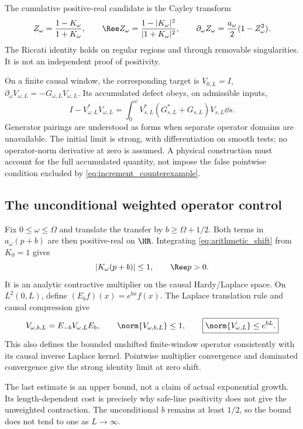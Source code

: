 The cumulative positive-real candidate is the Cayley transform
\begin{equation}
 Z_\omega=\frac{1-K_\omega}{1+K_\omega},\qquad
 \Ree Z_\omega=\frac{1-|K_\omega|^2}{|1+K_\omega|^2},\qquad
 \partial_\omega Z_\omega=\frac{a_\omega}{2}(1-Z_\omega^2).
 \label{eq:cumulative_cayley}
\end{equation}
The Riccati identity holds on regular regions and through removable
singularities. It is not an independent proof of positivity.

On a finite causal window, the corresponding target is
$V_{0,L}=I$, $\partial_\omega V_{\omega,L}=-G_{\omega,L}V_{\omega,L}$.
Its accumulated defect obeys, on admissible inputs,
\begin{equation}
 I-V_{\omega,L}^*V_{\omega,L}
 =\int_0^\omega
 V_{s,L}^*(G_{s,L}^*+G_{s,L})V_{s,L}\dd s.
 \label{eq:accumulated_defect}
\end{equation}
Generator pairings are understood as forms when separate operator domains
are unavailable. The initial limit is strong, with differentiation on
smooth tests; no operator-norm derivative at zero is assumed. A physical
construction must account for the full accumulated quantity, not impose
the false pointwise condition excluded by \eqref{eq:increment_counterexample}.

\subsection{The unconditional weighted operator control}

Fix $0\le\omega\le\Omega$ and translate the transfer by
$b\ge\Omega+1/2$. Both terms in $a_\omega(p+b)$ are then positive-real
on $\HR$. Integrating \eqref{eq:arithmetic_shift} from $K_0=1$ gives
\begin{equation}
 |K_\omega(p+b)|\le1,\qquad \Ree p>0.
\end{equation}
It is an analytic contractive multiplier on the causal Hardy/Laplace
space. On $L^2(0,L)$, define $(E_bf)(x)=e^{bx}f(x)$. The Laplace
translation rule and causal compression give
\begin{equation}
 V_{\omega,b,L}=E_{-b}V_{\omega,L}E_b,\qquad
 \norm{V_{\omega,b,L}}\le1,\qquad
 \boxed{\norm{V_{\omega,L}}\le e^{bL}.}
 \label{eq:weighted_bound}
\end{equation}
This also defines the bounded unshifted finite-window operator consistently
with its causal inverse Laplace kernel. Pointwise multiplier convergence
and dominated convergence give the strong identity limit at zero shift.

The last estimate is an upper bound, not a claim of actual exponential
growth. Its length-dependent cost is precisely why safe-line positivity
does not give the unweighted contraction. The unconditional $b$ remains
at least $1/2$, so the bound does not tend to one as $L\to\infty$.
